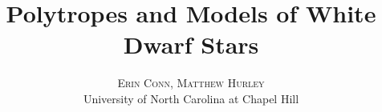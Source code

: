 \documentclass[twoside]{article}
\title{\vspace{-15mm}\fontsize{24pt}{10pt}\selectfont\textbf{Polytropes and
Models of White Dwarf Stars}} %
\author{
\large
\textsc{Erin Conn, Matthew Hurley}\\[2mm] %
\normalsize University of North Carolina at Chapel Hill \\ %
\vspace{-5mm}
}
\date{}
\begin{document}
\maketitle %

\thispagestyle{fancy} %


\begin{abstract}

\noindent 

\end{abstract}

\end{document}
